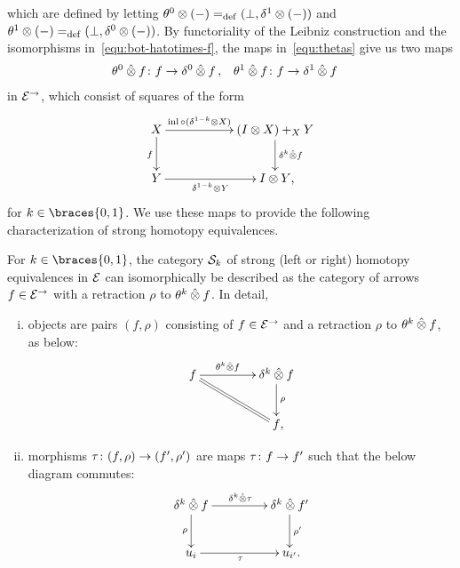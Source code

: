 \documentclass[reqno,10pt,a4paper,oneside,draft]{amsart}
\begin{document}
which are defined by letting $\thetal \otimes (-) \defeq (\bot, \rcyl \otimes (-))$ and $\thetar \otimes (-) \defeq (\bot, \lcyl \otimes (-))$.
By functoriality of the Leibniz construction and the isomorphisms in~\eqref{equ:bot-hatotimes-f}, the maps in~\eqref{equ:thetas} give us two maps
\begin{equation*}
\begin{aligned}
  \thetal \hatotimes f &\co f \to \lcyl \hatotimes f
\, ,&
  \thetar \hatotimes f &\co f \to \rcyl \hatotimes f
\end{aligned}
\end{equation*}
in $\catE^\to$, which consist of squares of the form
\[
\xymatrix@C+3em{
  X
  \ar[r]^-{\inl \cc (\kcylinv \otimes X)}
  \ar[d]_{f}
&
  (\interval \otimes X) +_{X} Y \ar[d]^{\kcyl \hatotimes f}
\\
  Y
  \ar[r]_-{\kcylinv \otimes Y}
&
  \interval \otimes Y
\rlap{,}}
\]
for $k \in \braces{0, 1}$.
We use these maps to provide the following characterization of strong homotopy equivalences.

\begin{lemma} \label{strong-h-equiv-as-section}
For $k \in \braces{0, 1}$, the category $\cal{S}_k$ of strong (left or right) homotopy equivalences in $\catE$ can isomorphically be described as the category of arrows $f \in \catE^{\to}$ with a retraction $\rho$ to $\thetak \hatotimes f$.
In detail,
\begin{enumerate}[(i)]
\item objects are pairs $(f, \rho)$ consisting of $f \in \catE^\to$ and a retraction $\rho$ to $\thetak \hatotimes f$, as below:
\[
\xymatrix@C+2em{
  f
  \ar[r]^-{\thetak \hatotimes f}
  \ar@{=}[dr]
&
  \kcyl \hatotimes f \ar[d]^{\rho}
\\&
  f
\rlap{,}}
\]
\item morphisms $\tau \co (f, \rho) \to (f', \rho')$ are maps $\tau \co f \to f'$ such that the below diagram commutes:
\[
\xymatrix@C+2em{
  \kcyl \hatotimes f
  \ar[d]_-{\rho}
  \ar[r]^{\kcyl \hatotimes \tau}
&
 \kcyl \hatotimes f'
  \ar[d]^-{\rho'}
\\
  u_i
  \ar[r]_{\tau}
&
  u_{i'} \rlap{.}
}
\]
\end{enumerate}
\end{lemma}
\end{document}

